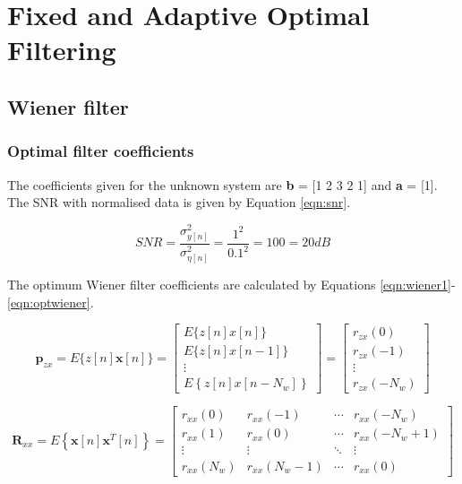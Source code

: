 
\section{Fixed and Adaptive Optimal Filtering}


\subsection{Wiener filter}

\subsubsection{Optimal filter coefficients}

The coefficients given for the unknown system are \textbf{b} = [1 2 3 2 1] and \textbf{a} = [1]. The SNR with normalised data is given by Equation \ref{eqn:snr}.

\begin{equation}
S N R=\frac{\sigma_{y[n]}^{2}}{\sigma_{\eta[n]}^{2}}=\frac{1^{2}}{0.1^{2}}=100=20 d B
\label{eqn:snr}
\end{equation}

\noindent
The optimum Wiener filter coefficients are calculated  by Equations \ref{eqn:wiener1}-\ref{eqn:optwiener}. 

\begin{equation}
\mathbf{p}_{z x}=E\{z[n] \mathbf{x}[n]\}=\left[\begin{array}{c}
E\{z[n] x[n]\} \\
E\{z[n] x[n-1]\} \\
\vdots \\
E\left\{z[n] x\left[n-N_{w}\right]\right\}
\end{array}\right]=\left[\begin{array}{c}
r_{z x}(0) \\
r_{z x}(-1) \\
\vdots \\
r_{z x}\left(-N_{w}\right)
\end{array}\right]
\label{eqn:wiener1}
\end{equation}

\begin{equation}
\mathbf{R}_{x x}=E\left\{\mathbf{x}[n] \mathbf{x}^{T}[n]\right\}=\left[\begin{array}{cccc}
r_{x x}(0) & r_{x x}(-1) & \cdots & r_{x x}\left(-N_{w}\right) \\
r_{x x}(1) & r_{x x}(0) & \cdots & r_{x x}\left(-N_{w}+1\right) \\
\vdots & \vdots & \ddots & \vdots \\
r_{x x}\left(N_{w}\right) & r_{x x}\left(N_{w}-1\right) & \cdots & r_{x x}(0)
\end{array}\right]
\label{eqn:weiner2}
\end{equation}

